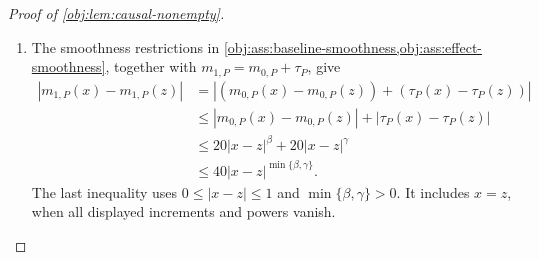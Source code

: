 \begin{proof}[Proof of \cref{obj:lem:causal-nonempty}]
\begin{enumerate}
For every Borel \(\mathsf E\subseteq\mathbb R\), evaluation on the two arm slices now gives, at almost every \(x\),
\[
\begin{aligned}
(1-e_P(x))\widetilde Q_{0,P}(\mathsf E\mid x)
&=(1-e_P(x))Q_{0,P}(\mathsf E\mid x),\\
e_P(x)\widetilde Q_{1,P}(\mathsf E\mid x)
&=e_P(x)Q_{1,P}(\mathsf E\mid x).
\end{aligned}
\]
Both weights are strictly positive by \cref{obj:ass:overlap}. Cancelling them proves
\[
\widetilde Q_{0,P}(\,\cdot\mid x)=Q_{0,P}(\,\cdot\mid x),
\qquad
\widetilde Q_{1,P}(\,\cdot\mid x)=Q_{1,P}(\,\cdot\mid x)
\qquad\text{for \(\lambda\)-almost every }x.
\]
The arm-mean version identities consequently imply
\[
\begin{aligned}
\widetilde m_{0,P}(x)
&=\int y\,\widetilde Q_{0,P}(dy\mid x)
 =\int y\,Q_{0,P}(dy\mid x)
 =m_{0,P}(x),\\
\widetilde m_{1,P}(x)
&=\int y\,\widetilde Q_{1,P}(dy\mid x)
 =\int y\,Q_{1,P}(dy\mid x)
 =m_{1,P}(x)
\end{aligned}
\qquad\text{for \(\lambda\)-almost every }x.
\]
Continuity upgrades both equalities to pointwise equalities. Subtraction then gives
\[
\widetilde\tau_P
=\widetilde m_{1,P}-\widetilde m_{0,P}
=m_{1,P}-m_{0,P}
=\tau_P
\qquad\text{pointwise on }[0,1].
\]

\item The smoothness restrictions in
\cref{obj:ass:baseline-smoothness,obj:ass:effect-smoothness}, together with
\(m_{1,P}=m_{0,P}+\tau_P\), give
\[
\begin{aligned}
|m_{1,P}(x)-m_{1,P}(z)|
&=|(m_{0,P}(x)-m_{0,P}(z))
   +(\tau_P(x)-\tau_P(z))|\\
&\le |m_{0,P}(x)-m_{0,P}(z)|
    +|\tau_P(x)-\tau_P(z)|\\
&\le20|x-z|^\beta+20|x-z|^\gamma\\
&\le40|x-z|^{\min\{\beta,\gamma\}}.
\end{aligned}
\]
The last inequality uses \(0\le|x-z|\le1\) and
\(\min\{\beta,\gamma\}>0\). It includes \(x=z\), when all displayed increments and powers vanish.


\end{enumerate}
\end{proof}
